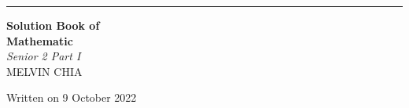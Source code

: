 \documentclass{report}
\begin{document}
\begin{titlepage}
    \raggedleft{}
    \rule{1pt}{\textheight}
    \hspace{0.02\textwidth}
    \parbox[b]{0.75\textwidth}{

    {\Huge\bfseries Solution Book of \\[0.5\baselineskip] Mathematic}\\[2\baselineskip]
    {\large\textit{Senior 2 Part I}}\\[4\baselineskip]
    {\Large\textsc{MELVIN CHIA}}

    \vspace{0.5\textheight}

    {\noindent Written on 9 October 2022}\\[\baselineskip]
    }

\end{titlepage}

\doublespacing{}
\tableofcontents
\singlespacing{}
\newpage
\end{document}

